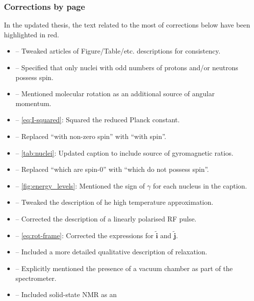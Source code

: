 \documentclass[12pt]{article}
\begin{document}
    \subsubsection*{Corrections by page}
    In the updated thesis, the text related to the most of corrections below
    have been highlighted in red.
    \begin{itemize}
        \item {} -- Tweaked articles of
            Figure/Table/etc. descriptions for consistency.
        \item {} -- Specified that only nuclei with odd
            numbers of protons and/or neutrons possess spin.
        \item {} -- Mentioned molecular rotation as
            an additional source of angular momentum.
        \item {} -- \cref{eq:I-squared}: Squared the
            reduced Planck constant.
        \item {} -- Replaced ``with non-zero spin'' with
            ``with spin''.
        \item {} -- \cref{tab:nuclei}: Updated caption to
            include source of gyromagnetic ratios.
        \item {} -- Replaced ``which are spin-0'' with ``which
            do not possess spin''.
        \item {} --  \cref{fig:energy_levels}:
            Mentioned the sign of $\gamma$ for each nucleus in the caption.
        \item {} -- Tweaked the description of he high
            temperature approximation.
        \item {} --  Corrected the description of a
            linearly polarised RF pulse.
        \item {} -- \cref{eq:rot-frame}: Corrected the
            expressions for $\tilde{\symbf{i}}$ and $\tilde{\symbf{j}}$.
        \item {} -- Included a more detailed
            qualitative description of relaxation.
        \item {} -- Explicitly mentioned the presence of a
            vacuum chamber as part of the spectrometer.
        \item {} -- Included solid-state NMR as an

\end{itemize}
\end{document}

